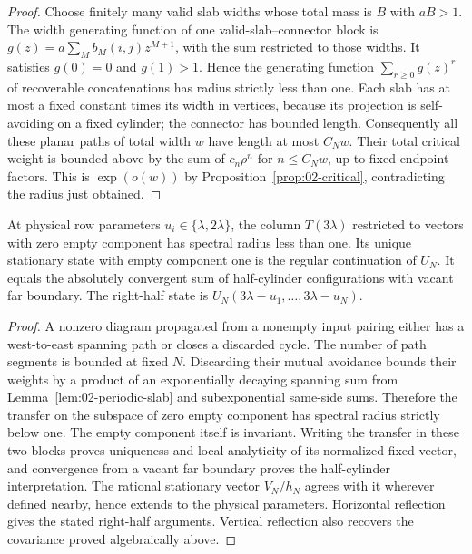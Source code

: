 \begin{proof}
Choose finitely many valid slab widths whose total mass is $B$ with
$aB>1$. The width generating function of one valid-slab--connector
block is $g(z)=a\sum_M b_M(i,j)z^{M+1}$, with the sum restricted to
those widths. It satisfies $g(0)=0$ and $g(1)>1$. Hence the generating
function $\sum_{r\ge0}g(z)^r$ of recoverable concatenations has radius
strictly less than one. Each slab has at most a fixed constant times
its width in vertices, because its projection is self-avoiding on a
fixed cylinder; the connector has bounded length. Consequently all
these planar paths of total width $w$ have length at most $C_Nw$.
Their total critical weight is bounded above by the sum of
$c_n\rho^n$ for $n\le C_Nw$, up to fixed endpoint factors. This is
$\exp(o(w))$ by Proposition~\ref{prop:02-critical}, contradicting the
radius just obtained.

\end{proof}

\begin{proposition}
At physical row parameters $u_i\in\{\lambda,2\lambda\}$,
\label{prop:02-cylinder-vacuum}
the column $T(3\lambda)$ restricted to vectors with zero empty
component has spectral radius less than one. Its unique stationary
state with empty component one is the regular continuation of $U_N$.
It equals the absolutely convergent sum of half-cylinder configurations
with vacant far boundary. The right-half state is
$U_N(3\lambda-u_1,\ldots,3\lambda-u_N)$.
\end{proposition}
\begin{proof}
A nonzero diagram propagated from a nonempty input pairing either
has a west-to-east spanning path or closes a discarded cycle. The
number of path segments is bounded at fixed $N$. Discarding their
mutual avoidance bounds their weights by a product of an exponentially
decaying spanning sum from Lemma~\ref{lem:02-periodic-slab} and
subexponential same-side sums. Therefore
the transfer on the subspace of zero empty component has spectral
radius strictly below one. The empty component itself is invariant.
Writing the transfer in these two blocks proves uniqueness and local
analyticity of its normalized fixed vector, and convergence from a
vacant far boundary proves the half-cylinder interpretation.
The rational stationary vector $V_N/h_N$ agrees with it wherever
defined nearby, hence extends to the physical parameters. Horizontal
reflection gives the stated right-half arguments. Vertical reflection
also recovers the covariance proved algebraically above.
\end{proof}

